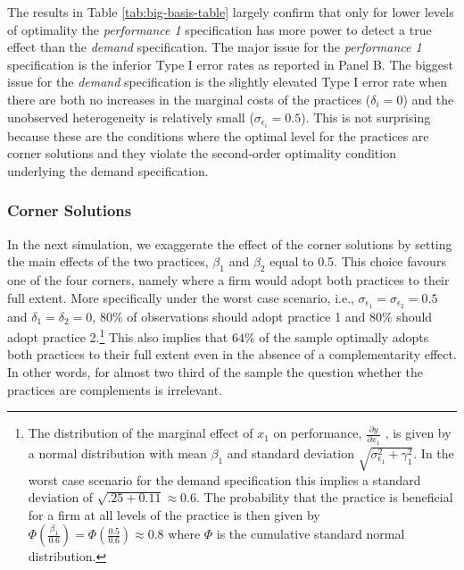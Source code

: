 \documentclass[12pt]{article}
\begin{document}


The results in Table \ref{tab:big-basis-table} largely confirm that only for lower levels of optimality the \emph{performance 1} specification has more power to detect a true effect than the \emph{demand} specification. The major issue for the \emph{performance 1} specification is the inferior Type I error rates as reported in Panel B. The biggest issue for the \emph{demand} specification is the slightly elevated Type I error rate when there are both no increases in the marginal costs of the practices ($\delta_i = 0$) and the unobserved heterogeneity is relatively small ($\sigma_{\epsilon_i} = 0.5$). This is not surprising because these are the conditions where the optimal level for the practices are corner solutions and they violate the second-order optimality condition underlying the demand specification.

\subsubsection{Corner Solutions}

In the next simulation, we exaggerate the effect of the corner solutions by setting the main effects of the two practices, $\beta_{1}$ and $\beta_2$ equal to 0.5. This choice favours one of the four corners, namely where a firm would adopt both practices to their full extent. More specifically under the worst case scenario, i.e., $\sigma_{\epsilon_1} = \sigma_{\epsilon_2} = 0.5$ and $\delta_1 = \delta_2 = 0$, $80\%$ of observations should adopt practice 1 and $80\%$ should adopt practice 2.\footnote{The distribution of the marginal effect of $x_1$  on performance, $\frac{\partial y}{\partial x_1}$ , is given by a normal distribution with mean $\beta_1$ and standard deviation $\sqrt{\sigma_{\epsilon_1}^2 + \gamma_1^2}$. In the worst case scenario for the demand specification this implies a standard deviation of $\sqrt{.25 + 0.11} \approx  0.6$. The probability that the practice is beneficial for a firm at all levels of the practice is then given by $\Phi(\frac{\beta_1}{0.6}) = \Phi(\frac{0.5}{0.6}) \approx 0.8$ where $\Phi$ is the cumulative standard normal distribution.}
This also implies that $64\%$ of the sample optimally adopts both practices to their full extent even in the absence of a complementarity effect. In other words, for almost two third of the sample the question whether the practices are complements is irrelevant.   


\end{document}
